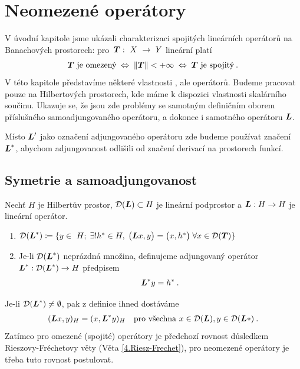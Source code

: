 \section{Neomezené operátory}
V úvodní kapitole jsme ukázali charakterizaci spojitých lineárních operátorů na Banachových prostorech: pro~$\boldsymbol{T}:~X~\to~Y$ lineární platí \begin{align*}
    \boldsymbol{T} \text{ je omezený} \;\Leftrightarrow\; \left\lVert\boldsymbol{T}\right\rVert < +\infty \;\Leftrightarrow\; \boldsymbol{T} \text{ je spojitý} \:.
\end{align*}
V této kapitole představíme některé vlastnosti , ale  operátorů.
Budeme pracovat pouze na Hilbertových prostorech, kde máme k dispozici vlastnosti skalárního součinu. Ukazuje se, že jsou zde problémy se samotným definičním oborem příslušného samoadjungovaného operátoru, a dokonce i samotného operátoru $\boldsymbol{L}$.

\begin{remark}
Místo $\boldsymbol{L}'$ jako označení adjungovaného operátoru zde budeme používat značení $\boldsymbol{L}^*$, abychom adjungovanost odlišili od značení derivací na prostorech funkcí.
\end{remark}


\subsection{Symetrie a samoadjungovanost}
\begin{definition}
Nechť $H$ je Hilbertův prostor, $\mathcal{D}(\boldsymbol{L}) \subset H$ je lineární podprostor a $\boldsymbol{L} : H \to H$ je lineární operátor.
\begin{enumerate}
    \item $\domain(\map L^*) \coloneqq\{y\in\ H;\;\exists!h^*\in H,\;\innerprod{\map Lx}{y}=\innerprod{x}{h^*}\;\forall x\in\domain(\map T)\}$
    \item Je-li $\mathcal{D}(\boldsymbol{L}^*)$ neprázdná množina, definujeme adjungovaný operátor $\boldsymbol{L}^* : \mathcal{D}(\boldsymbol{L}^*) \to H$ předpisem \begin{align*}
        \boldsymbol{L}^* y = h^* \:.
    \end{align*}
\end{enumerate}
\end{definition}

\begin{remark}
Je-li $\mathcal{D}(\boldsymbol{L}^*) \neq \emptyset$, pak z definice ihned dostáváme \begin{align*}
    (\boldsymbol{L} x,y)_H =(x, \boldsymbol{L}^* y)_H \quad \text{pro všechna } x \in \mathcal{D}(\boldsymbol{L}), y \in \mathcal{D}(\boldsymbol{L}*) \:.
\end{align*}
Zatímco pro omezené (spojité) operátory je předchozí rovnost důsledkem Rieszovy-Fréchetovy věty (Věta \ref{4.Riesz-Frechet}), pro neomezené operátory je třeba tuto rovnost postulovat.
\end{remark}

